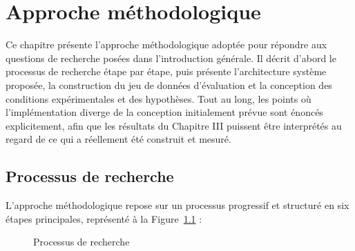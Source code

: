 \documentclass[12pt]{report}
\begin{document}
\chapter{Approche méthodologique}
Ce chapitre présente l'approche méthodologique adoptée pour répondre aux questions de recherche posées dans l'introduction générale. Il décrit d'abord le processus de recherche étape par étape, puis présente l'architecture système proposée, la construction du jeu de données d'évaluation et la conception des conditions expérimentales et des hypothèses. Tout au long, les points où l'implémentation diverge de la conception initialement prévue sont énoncés explicitement, afin que les résultats du Chapitre III puissent être interprétés au regard de ce qui a réellement été construit et mesuré.
\section{Processus de recherche}
L'approche méthodologique repose sur un processus progressif et structuré en six étapes principales, représenté à la Figure~\ref{fig:process} :
\begin{figure}[H]
\centering
{}
\caption{Processus de recherche}
\label{fig:process}
\end{figure}
\end{document}
